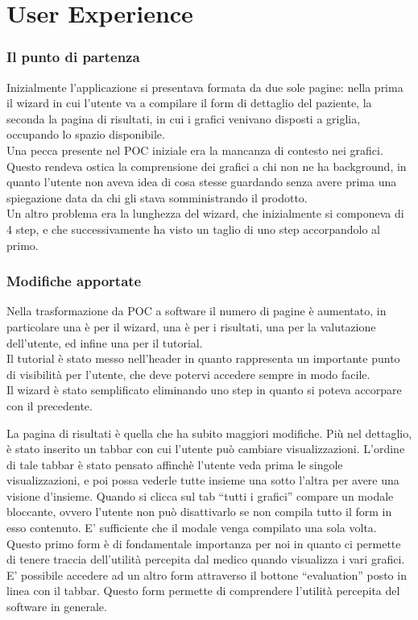 \chapter{User Experience }
\label{cap:user-experience}

\subsection{Il punto di partenza}
Inizialmente l'applicazione si presentava formata da due sole pagine: nella prima il wizard in cui l'utente va a compilare il form di dettaglio del paziente, la seconda la pagina di risultati, in cui i grafici venivano disposti a griglia, occupando lo spazio disponibile.\\
Una pecca presente nel POC iniziale era la mancanza di contesto nei grafici. Questo rendeva ostica la comprensione dei grafici a chi non ne ha background, in quanto l'utente non aveva idea di cosa stesse guardando senza avere prima una spiegazione data da chi gli stava somministrando il prodotto. \\
Un altro problema era la lunghezza del wizard, che inizialmente si componeva di 4 step, e che successivamente ha visto un taglio di uno step accorpandolo al primo. \\

\subsection{Modifiche apportate}

Nella trasformazione da POC a software il numero di pagine è aumentato, in particolare una è per il wizard, una è per i risultati, una per la valutazione dell'utente, ed infine una per il tutorial. \\
Il tutorial è stato messo nell'header in quanto rappresenta un importante punto di visibilità per l'utente, che deve potervi accedere sempre in modo facile. \\
Il wizard è stato semplificato eliminando uno step in quanto si poteva accorpare con il precedente. 

La pagina di risultati è quella che ha subito maggiori modifiche. Più nel dettaglio, è stato inserito un tabbar con cui l'utente può cambiare visualizzazioni. L'ordine di tale tabbar è stato pensato affinchè l'utente veda prima le singole visualizzazioni, e poi possa vederle tutte insieme una sotto l'altra per avere una visione d'insieme. Quando si clicca sul tab “tutti i grafici” compare un modale bloccante, ovvero l'utente non può disattivarlo se non compila tutto il form in esso contenuto. E' sufficiente che il modale venga compilato una sola volta. Questo primo form è di fondamentale importanza per noi in quanto ci permette di tenere traccia dell'utilità percepita dal medico quando visualizza i vari grafici.\\ 
E' possibile accedere ad un altro form attraverso il bottone “evaluation” posto in linea con il tabbar. Questo form permette di comprendere l'utilità percepita del software in generale. \\

